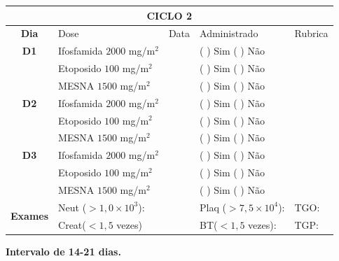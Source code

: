 \documentclass[11pt,a4paper,oldfontcommands]{memoir}
\begin{document}
\clearpage
\begin{center}
\begin{longtable}{p{1cm}p{4cm}|p{1cm}|p{3cm}|p{3cm}}
	\hline
	\multicolumn{5}{c}{\textbf{CICLO 2}}\\
\hline
    \multicolumn{1}{c|}{\multirow{1}{*}{\textbf{Dia}}}&{Dose}&{Data}&{Administrado}&{Rubrica} \\
    \hline
    \multicolumn{1}{c|}{\multirow{1}{*}{\textbf{D1}}}&{Ifosfamida \(2000\) mg/m\(^2\)}&&{(  ) Sim (  ) Não}&\\
    \multicolumn{1}{c|}{\multirow{1}{*}{\textbf{}}}&{Etoposido \(100\) mg/m\(^2\)}&&{(  ) Sim (  ) Não}&\\
    \multicolumn{1}{c|}{\multirow{1}{*}{\textbf{}}}&{MESNA \(1500\) mg/m\(^2\)}&&{(  ) Sim (  ) Não}&\\
    \multicolumn{1}{c|}{\multirow{1}{*}{\textbf{D2}}}&{Ifosfamida \(2000\) mg/m\(^2\)}&&{(  ) Sim (  ) Não}&\\
    \multicolumn{1}{c|}{\multirow{1}{*}{\textbf{}}}&{Etoposido \(100\) mg/m\(^2\)}&&{(  ) Sim (  ) Não}&\\
    \multicolumn{1}{c|}{\multirow{1}{*}{\textbf{}}}&{MESNA \(1500\) mg/m\(^2\)}&&{(  ) Sim (  ) Não}&\\
    \multicolumn{1}{c|}{\multirow{1}{*}{\textbf{D3}}}&{Ifosfamida \(2000\) mg/m\(^2\)}&&{(  ) Sim (  ) Não}&\\
    \multicolumn{1}{c|}{\multirow{1}{*}{\textbf{}}}&{Etoposido \(100\) mg/m\(^2\)}&&{(  ) Sim (  ) Não}&\\
    \multicolumn{1}{c|}{\multirow{1}{*}{\textbf{}}}&{MESNA \(1500\) mg/m\(^2\)}&&{(  ) Sim (  ) Não}&\\

    \hline
    \multicolumn{1}{c|}{\multirow{2}{*}{\textbf{Exames}}}&\multicolumn{2}{l|}{Neut (\(>1,0\times10^3\)):}&{Plaq (\(>7,5\times10^4\)):}&{TGO:}\\
    \cline{2-5}
    \multicolumn{1}{c|}{\multirow{2}{*}{{}}}&\multicolumn{2}{l|}{Creat(\(<1,5\) vezes)}&{BT(\(<1,5\) vezes):}&{TGP:}
    \\
    \hline
\end{longtable}
\textbf{Intervalo de 14-21 dias.}
\end{center}
\end{document}

